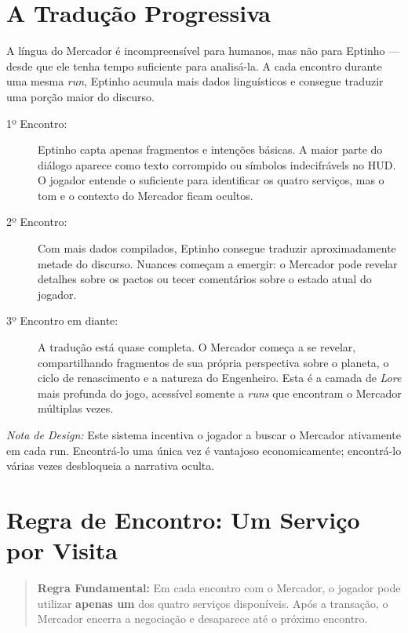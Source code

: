 \documentclass[a4paper,12pt]{report}
\begin{document}
\section{A Tradução Progressiva}\label{sec:traducao}
A língua do Mercador é incompreensível para humanos, mas não para Eptinho — desde que ele tenha tempo suficiente para analisá-la. A cada encontro durante uma mesma \textit{run}, Eptinho acumula mais dados linguísticos e consegue traduzir uma porção maior do discurso.

\begin{description}
    \item[1º Encontro:] Eptinho capta apenas fragmentos e intenções básicas. A maior parte do diálogo aparece como texto corrompido ou símbolos indecifrávels no HUD. O jogador entende o suficiente para identificar os quatro serviços, mas o tom e o contexto do Mercador ficam ocultos.

    \item[2º Encontro:] Com mais dados compilados, Eptinho consegue traduzir aproximadamente metade do discurso. Nuances começam a emergir: o Mercador pode revelar detalhes sobre os pactos ou tecer comentários sobre o estado atual do jogador.

    \item[3º Encontro em diante:] A tradução está quase completa. O Mercador começa a se revelar, compartilhando fragmentos de sua própria perspectiva sobre o planeta, o ciclo de renascimento e a natureza do Engenheiro. Esta é a camada de \textit{Lore} mais profunda do jogo, acessível somente a \textit{runs} que encontram o Mercador múltiplas vezes.
\end{description}

\textit{Nota de Design:} Este sistema incentiva o jogador a buscar o Mercador ativamente em cada run. Encontrá-lo uma única vez é vantajoso economicamente; encontrá-lo várias vezes desbloqueia a narrativa oculta.

\section{Regra de Encontro: Um Serviço por Visita}
\begin{quote}
    \textbf{Regra Fundamental:} Em cada encontro com o Mercador, o jogador pode utilizar \textbf{apenas um} dos quatro serviços disponíveis. Após a transação, o Mercador encerra a negociação e desaparece até o próximo encontro.
\end{quote}
\end{document}
